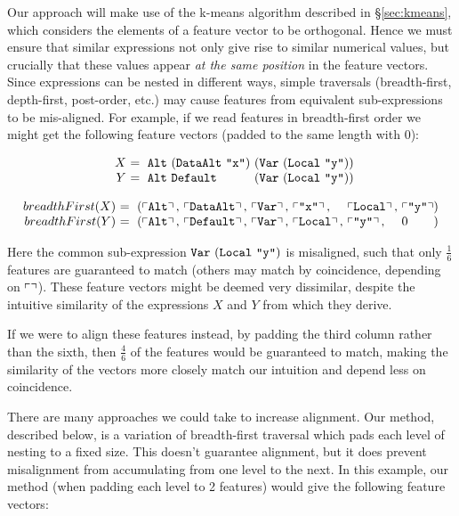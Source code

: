 Our approach will make use of the k-means algorithm described in \S \ref{sec:kmeans}, which considers the elements of a feature vector to be orthogonal. Hence we must ensure that similar expressions not only give rise to similar numerical values, but crucially that these values appear \emph{at the same position} in the feature vectors. Since expressions can be nested in different ways, simple traversals (breadth-first, depth-first, post-order, etc.) may cause features from equivalent sub-expressions to be mis-aligned. For example, if we read features in breadth-first order we might get the following feature vectors (padded to the same length with $0$):

\begin{small}
  \begin{equation*}
    \begin{array}{r@{}l@{}l@{}}
      X\ &=\ \CAlt\ (\CDataAlt\ \id{x})\ & (\vlocal{y}) \\
      Y\ &=\ \CAlt\ \CDefault\           & (\vlocal{y})
    \end{array}
  \end{equation*}

  \begin{equation*}
    \begin{array}{r@{}l@{}l@{}l@{}l@{}l@{}l@{}l}
      breadthFirst(X)\ &=\ (\feature{\CAlt},\ &\feature{\CDataAlt},\ &\feature{\CVar},\ &\feature{\id{x}},\ &\feature{\CLocal},\ &\feature{\id{y}} &) \\
      breadthFirst(Y)\ &=\ (\feature{\CAlt},\ &\feature{\CDefault},\ &\feature{\CVar},\ &\feature{\CLocal},\ &\feature{\id{y}},\ &0 &)
    \end{array}
  \end{equation*}
\end{small}

Here the common sub-expression $\texttt{Var}\ (\texttt{Local}\ \texttt{"y"})$ is misaligned, such that only $\frac{1}{6}$ features are guaranteed to match (others may match by coincidence, depending on $\left\ulcorner  \right\urcorner$). These feature vectors might be deemed very dissimilar, despite the intuitive similarity of the expressions $X$ and $Y$ from which they derive.

If we were to align these features instead, by padding the third column rather than the sixth, then $\frac{4}{6}$ of the features would be guaranteed to match, making the similarity of the vectors more closely match our intuition and depend less on coincidence.

There are many approaches we could take to increase alignment. Our method, described below, is a variation of breadth-first traversal which pads each level of nesting to a fixed size. This doesn't guarantee alignment, but it does prevent misalignment from accumulating from one level to the next. In this example, our method (when padding each level to 2 features) would give the following feature vectors:

